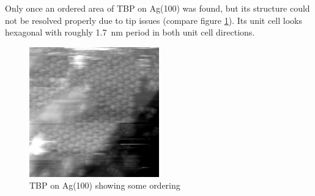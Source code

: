 Only once an ordered area of TBP on Ag(100) was found, but its structure could not be resolved properly due to tip issues (compare figure \ref{fig:hex-TBP-Ag100}). Its unit cell looks hexagonal with roughly \SI{1.7} {\nano \meter} period in both unit cell directions. 

\begin{figure}[h]
 \centering
 \includegraphics[width=0.5\textwidth]{./images/F151007-112800}
 \caption{TBP on Ag(100) showing some ordering}
 \label{fig:hex-TBP-Ag100}
\end{figure}

